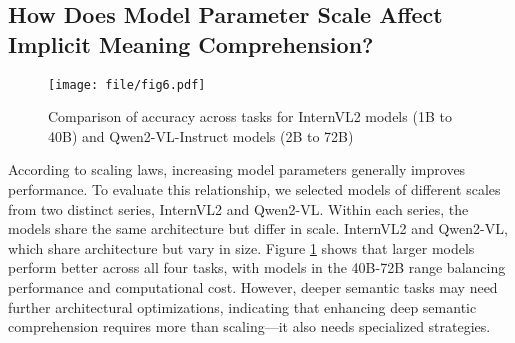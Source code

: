 \subsection{How Does Model Parameter Scale Affect Implicit Meaning Comprehension?}
\begin{figure}[t]
  \centering
  \texttt{[image: file/fig6.pdf]}
   \caption{Comparison of accuracy across tasks for InternVL2 models (1B to 40B) and Qwen2-VL-Instruct models (2B to 72B)}
   \label{fig:bar}
\end{figure}

According to scaling laws, increasing model parameters generally improves performance. To evaluate this relationship, we selected models of different scales from two distinct series, InternVL2 and Qwen2-VL. Within each series, the models share the same architecture but differ in scale. InternVL2 and Qwen2-VL, which share architecture but vary in size. Figure \ref{fig:bar} shows that larger models perform better across all four tasks, with models in the 40B-72B range balancing performance and computational cost. However, deeper semantic tasks may need further architectural optimizations, indicating that enhancing deep semantic comprehension requires more than scaling—it also needs specialized strategies.






